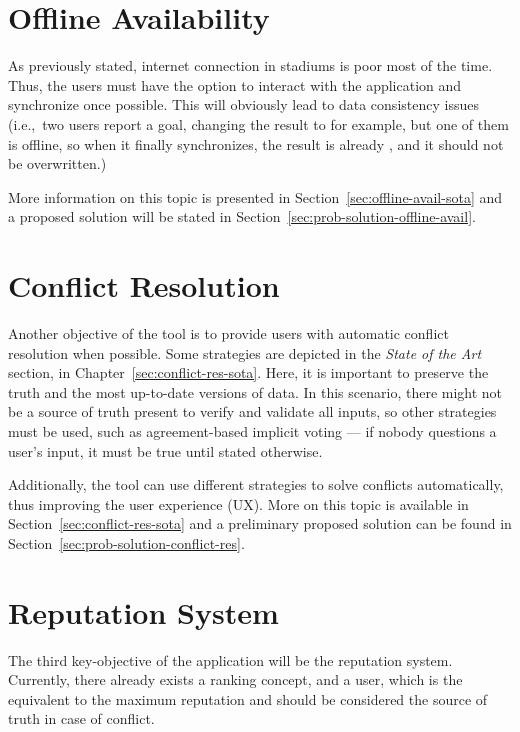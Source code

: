 \section{Offline Availability} \label{sec:offline-avail-intro}

As previously stated, internet connection in stadiums is poor most of the time. Thus, the users must have the option to interact with the application and synchronize once possible. This will obviously lead to data consistency issues (i.e.,\ two users report a goal, changing the result to  for example, but one of them is offline, so when it finally synchronizes, the result is already , and it should not be overwritten.)

More information on this topic is presented in Section~\ref{sec:offline-avail-sota} and a proposed solution will be stated in Section~\ref{sec:prob-solution-offline-avail}.

\section{Conflict Resolution} \label{sec:conflict-res-intro}

Another objective of the tool is to provide users with automatic conflict resolution when possible. Some strategies are depicted in the \textit{State of the Art} section, in Chapter~\ref{sec:conflict-res-sota}. Here, it is important to preserve the truth and the most up-to-date versions of data. In this scenario, there might not be a source of truth present to verify and validate all inputs, so other strategies must be used, such as agreement-based implicit voting --- if nobody questions a user's input, it must be true until stated otherwise.

Additionally, the tool can use different strategies to solve conflicts automatically, thus improving the user experience (UX). More on this topic is available in Section~\ref{sec:conflict-res-sota} and a preliminary proposed solution can be found in Section~\ref{sec:prob-solution-conflict-res}.

\section{Reputation System} \label{sec:rep-sys-intro}

The third key-objective of the application will be the reputation system. Currently, there already exists a ranking concept, and a  user, which is the equivalent to the maximum reputation and should be considered the source of truth in case of conflict.

